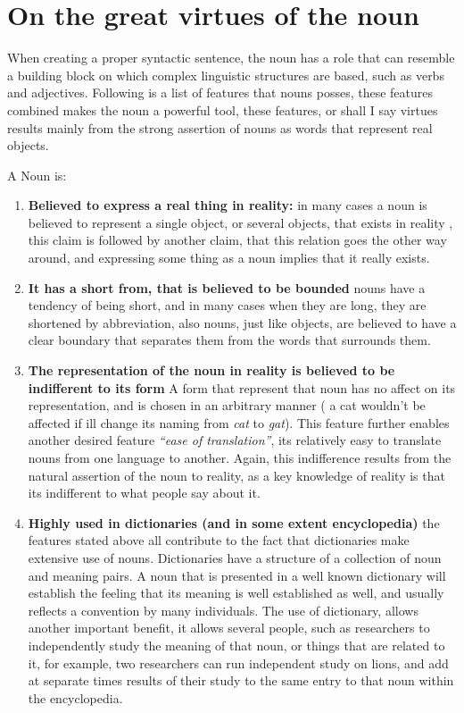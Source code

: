 \documentclass[10pt]{article}
\begin{document}
\section*{On the great virtues of the noun}

When creating a proper syntactic sentence, the noun has a role that can resemble a building block on which complex linguistic structures are based, such as verbs and adjectives. Following is a list of features that nouns posses,  these features combined makes the noun a powerful tool, these features, or shall I say virtues results mainly from the strong assertion of nouns as words that represent real objects.

A Noun is:
\begin{enumerate}
\item
\textbf{ Believed to express a real thing in reality:} in many cases a noun is believed to represent a single object, or several  objects, that exists in reality , this claim is followed by another claim, that this relation goes the other way around, and expressing some thing as a noun implies that it really exists.
\item
\textbf{It has a short from, that is believed to be bounded} nouns have a tendency of being short, and in many cases when they are long, they are shortened by abbreviation, also nouns, just like objects, are believed to have a clear boundary that separates them from the words that surrounds them.

\item
\textbf{ The representation of the noun in reality is believed to be indifferent to its form} A form  that represent that noun has no affect on its representation, and is chosen in an arbitrary manner ( a cat wouldn't be affected if ill change its naming from \textit{cat} to  \textit{gat}). This feature further enables another desired feature \textit{“ease of translation”}, its relatively easy to translate nouns from one language to another. Again, this indifference results from the natural assertion of the noun to reality, as a key knowledge of reality is that its indifferent to what people say about it.

\item
\textbf{ Highly used in dictionaries (and in some extent encyclopedia)} the features stated above all contribute to the fact that dictionaries make extensive use of nouns. Dictionaries have a structure of a collection of noun and meaning pairs. A noun that is presented in a well known dictionary will establish the feeling that its meaning is well established as well, and usually reflects a convention by many individuals. The use of dictionary, allows another important benefit, it allows several people, such as researchers to independently study the meaning of that noun, or things that are related to it, for example, two researchers can run independent study on lions, and add at separate times results of their study to the same  entry to that noun within the encyclopedia.


\end{enumerate}
\end{document}
